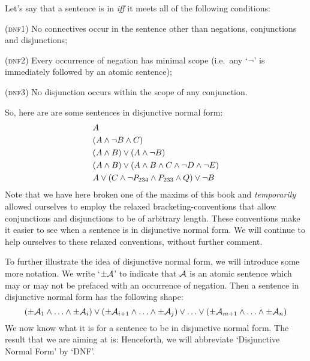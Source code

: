 Let's say that a sentence is in  \emph{iff} it meets all of the following conditions:
	\begin{earg}
		\item[(\textsc{dnf1})] No connectives occur in the sentence other than negations, conjunctions and disjunctions;
		\item[(\textsc{dnf2})] Every occurrence of negation has minimal scope (i.e.\ any `$\neg$' is immediately followed by an atomic sentence);
		\item[(\textsc{dnf3})] No disjunction occurs within the scope of any conjunction.
	\end{earg}
So, here are are some sentences in disjunctive normal form:
\begin{align*}
  & A \\
  & (A \wedge \lnot B \wedge C)\\
  & (A \wedge B) \vee (A \wedge \neg B)\\
  & (A \wedge B) \vee (A \wedge  B \wedge C \wedge \neg D \wedge \neg E)\\
  & A \vee (C \wedge \neg P_{234} \wedge P_{233} \wedge Q) \vee \neg B
\end{align*}
Note that we have here broken one of the maxims of this book and \emph{temporarily} allowed ourselves to employ the relaxed bracketing-conventions that allow conjunctions and disjunctions to be of arbitrary length. These conventions make it easier to see when a sentence is in disjunctive normal form. We will continue to help ourselves to these relaxed conventions, without further comment.

To further illustrate the idea of disjunctive normal form, we will introduce some more notation. We write `$\pm\mathcal{A}$' to indicate that $\mathcal{A}$ is an atomic sentence which may or may not be prefaced with an occurrence of negation. Then a sentence in disjunctive normal form has the following shape:
	$$(\pm \mathcal{A}_1 \land \ldots \land \pm \mathcal{A}_i) \lor (\pm \mathcal{A}_{i+1} \land \ldots \land \pm\mathcal{A}_j) \lor \ldots \lor (\pm\mathcal{A}_{m+1} \land \ldots \land \pm \mathcal{A}_n)$$
We now know what it is for a sentence to be in disjunctive normal form. The result that we are aiming at is:
Henceforth, we will abbreviate `Disjunctive Normal Form' by `DNF'. 


